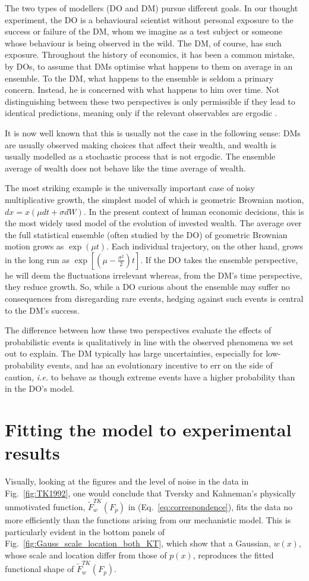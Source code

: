 \documentclass[%
	a4paper,
	abstract=true,	
	12pt,
	numbers=noenddot,
]{scrartcl}
\newcommand{\eref}[1]{(Eq.~\ref{eq:#1})}
\newcommand{\fref}[1]{Fig.~\ref{fig:#1}}
\newcommand{\seclabel}[1]{\label{sec:#1}}
\newcommand{\ie}{\textit{i.e.}\xspace}
\begin{document}
The two types of modellers (DO and DM) pursue different goals. In our thought experiment, the DO is a behavioural scientist without personal exposure to the success or failure of the DM, whom we imagine as a test subject or someone whose behaviour is being observed in the wild. The DM, of course, has such exposure. Throughout the history of economics, it has been a common mistake, by DOs, to assume that DMs optimise what happens to them on average in an ensemble. To the DM, what happens to the ensemble is seldom a primary concern. Instead, he is concerned with what happens to him over time. Not distinguishing between these two perspectives is only permissible if they lead to identical predictions, meaning only if the relevant observables are ergodic \parencite{Peters2019b}.

It is now well known that this is usually not the case in the following sense: DMs are usually observed making choices that affect their wealth, and wealth is usually modelled as a stochastic process that is not ergodic. The ensemble average of wealth does not behave like the time average of wealth.

The most striking example is the universally important case of noisy multiplicative growth, the simplest model of which is geometric Brownian motion, $dx=x(\mu dt+\sigma dW)$. In the present context of human economic decisions, this is the most widely used model of the evolution of invested wealth. The average over the full statistical ensemble (often studied by the DO) of geometric Brownian motion grows as $\exp(\mu t)$. Each individual trajectory, on the other hand, grows in the long run as $\exp[(\mu-\frac{\sigma^2}{2})t]$. If the DO takes the ensemble perspective, he will deem the fluctuations irrelevant whereas, from the DM's time perspective, they reduce growth. So, while a DO curious about the ensemble may suffer no consequences from disregarding rare events, hedging against such events is central to the DM's success.

The difference between how these two perspectives evaluate the effects of probabilistic events is qualitatively in line with the observed phenomena we set out to explain. The DM typically has large uncertainties, especially for low-probability events, and has an evolutionary incentive to err on the side of caution, \ie to behave as though extreme events have a higher probability than in the DO's model.

\section{Fitting the model to experimental results \seclabel{Fitting_the}}
Visually, looking at the figures and the level of noise in the data in \fref{TK1992}, one would conclude that Tversky and Kahneman's physically unmotivated function, $\tilde{F}^{TK}_w(F_p)$ in \eref{correspondence}, fits the data no more efficiently than the functions arising from our mechanistic model. This is particularly evident in the bottom panels of \fref{Gauss_scale_location_both_KT}, which show that a Gaussian, $w(x)$, whose scale and location differ from those of $p(x)$, reproduces the fitted functional shape of $\tilde{F}^{TK}_w(F_p)$.
\end{document}
